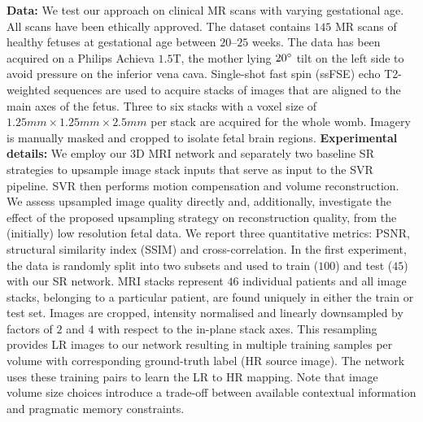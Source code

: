 \documentclass[runningheads,a4paper]{llncs}
\makeatletter
\newcommand{\todo}[1]{}
\renewcommand{\todo}[1]{{\color{red} TODO: {#1}}}
\let\origsection\section
\renewcommand\section{\@ifstar{\starsection}{\nostarsection}}
\newcommand\nostarsection[1]
{\sectionprelude\origsection{#1}\sectionpostlude}
\newcommand\starsection[1]
{\sectionprelude\origsection*{#1}\sectionpostlude}
\newcommand\sectionprelude{%
  \vspace{-2mm}
}
\newcommand\sectionpostlude{%
  \vspace{0mm}
}
\makeatother
\begin{document}
\section{Experiments}
\vspace{-1mm}
\label{sec:experiments}
\noindent\textbf{Data:} 
We test our approach on clinical MR scans with varying gestational age. All scans have been ethically approved. The dataset contains $145$ MR scans of healthy fetuses at gestational age between $20$--$25$ weeks. The data has been acquired on a Philips Achieva $1.5$T, the mother lying $20\degree$ tilt on the left side to avoid pressure on the inferior vena cava. Single-shot fast spin (ssFSE) echo T2-weighted sequences are used to acquire stacks of images that are aligned to the main axes of the fetus. Three to six stacks with a voxel size of $1.25mm \times 1.25mm \times 2.5mm$  per stack are acquired for the whole womb. Imagery is manually masked and cropped to isolate fetal brain regions. %
\newline
\newline
\noindent\textbf{Experimental details:} We employ our 3D MRI network and separately two baseline SR strategies to upsample image stack inputs that serve as input to the SVR pipeline. SVR then performs motion compensation and volume reconstruction. We assess upsampled image quality directly and, additionally, investigate the effect of the proposed upsampling strategy on reconstruction quality, from the (initially) low resolution fetal data. We report three quantitative metrics: PSNR, structural similarity index  (SSIM) %
and cross-correlation. In the first experiment, the data is randomly split into two subsets and used to train ($100$) and test ($45$) with our SR network. MRI stacks represent $46$ individual patients and all image stacks, belonging to a particular patient, are found uniquely in either the train or test set. Images are cropped, intensity normalised and linearly downsampled by factors of $2$ and $4$ with respect to the in-plane stack axes. This resampling provides LR images to our network resulting in multiple training samples per volume with corresponding ground-truth label (HR source image). The network uses these training pairs to learn the LR to HR mapping. Note that image volume size choices introduce a trade-off between available contextual information and pragmatic memory constraints.
\end{document}
